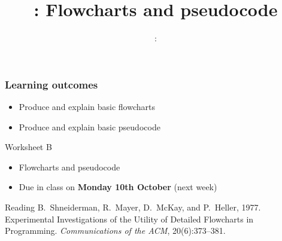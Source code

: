 \usepackage{../../beamerthemeFalmouthGamesAcademy}
\usepackage{multimedia}
\graphicspath{ {../../} }

\lstset{language=Python
}

\usepackage[normalem]{ulem}
\usepackage{wasysym}

\usepackage{pdfpages}

\usetikzlibrary{arrows,automata}




\title{\sessionnumber: Flowcharts and pseudocode}
\subtitle{\modulecode: \moduletitle}

\frame{\titlepage} 

\begin{frame}
	\frametitle{Learning outcomes}
	\begin{itemize}
		\item Produce and explain basic flowcharts
		\item Produce and explain basic pseudocode
	\end{itemize}
\end{frame}

\begin{frame}{Worksheet B}
	\begin{itemize}
		\item Flowcharts and pseudocode
		\item Due in class on \textbf{Monday 10th October} (next week)
	\end{itemize}
\end{frame}

\begin{frame}{Reading}
	B.\ Shneiderman, R.\ Mayer, D.\ McKay, and P.\ Heller, 1977.
	Experimental Investigations of the Utility of Detailed Flowcharts in Programming.
	\emph{Communications of the ACM},
	20(6):373--381.
\end{frame}







